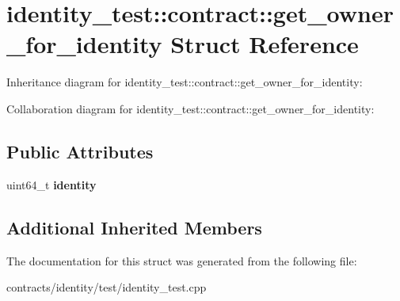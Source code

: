 \hypertarget{structidentity__test_1_1contract_1_1get__owner__for__identity}{}\section{identity\+\_\+test\+:\+:contract\+:\+:get\+\_\+owner\+\_\+for\+\_\+identity Struct Reference}
\label{structidentity__test_1_1contract_1_1get__owner__for__identity}


Inheritance diagram for identity\+\_\+test\+:\+:contract\+:\+:get\+\_\+owner\+\_\+for\+\_\+identity\+:


Collaboration diagram for identity\+\_\+test\+:\+:contract\+:\+:get\+\_\+owner\+\_\+for\+\_\+identity\+:
\subsection*{Public Attributes}
\begin{DoxyCompactItemize}
\item 
\mbox{\label{structidentity__test_1_1contract_1_1get__owner__for__identity_a2207d4c605f350420f3ff615d4043bc7}} 
uint64\+\_\+t {\bfseries identity}
\end{DoxyCompactItemize}
\subsection*{Additional Inherited Members}


The documentation for this struct was generated from the following file\+:\begin{DoxyCompactItemize}
\item 
contracts/identity/test/identity\+\_\+test.\+cpp\end{DoxyCompactItemize}
